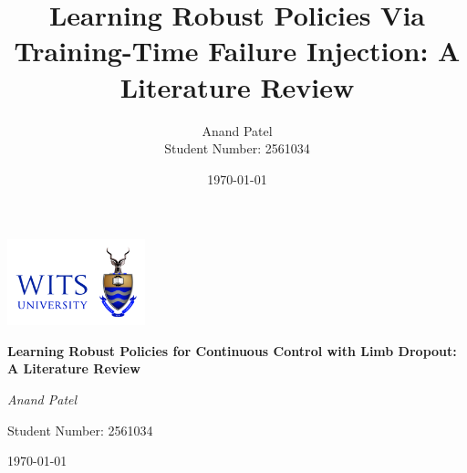 \documentclass[12pt, a4paper]{article} %
\title{Learning Robust Policies Via Training-Time Failure Injection: A Literature Review}
\author{Anand Patel \\ Student Number: 2561034} %
\date{\today} %
\begin{document}
\begin{titlepage}
    \centering %

    \vspace*{1cm} %
    \includegraphics[width=0.3\textwidth]{witslogo_h.png} %
    \vspace{2cm} %

    {\Huge\bfseries Learning Robust Policies for Continuous Control with Limb Dropout: A Literature Review \par} %

    \vspace{1.5cm} %

    {\Large \textit{Anand Patel} \par} %
    \vspace{0.5cm} %

    {\large Student Number: 2561034 \par} %

    \vfill %

    {\large \today} %

\end{titlepage}

\newpage %
\tableofcontents %
\newpage %

\end{document}
